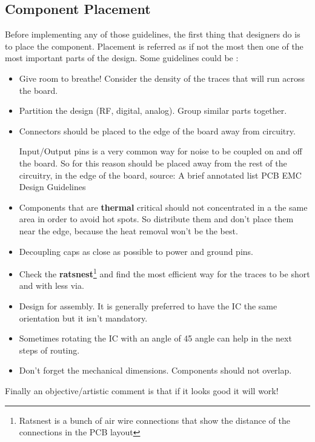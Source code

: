 \documentclass[final]{cubedoc}
\begin{document}
	\subsection{Component Placement}
	
	Before implementing any of those guidelines, the first thing that designers do is to place the component. Placement is referred as if not the most then one of the most important parts of the design. Some guidelines could be \cite{allcircuits:thermal, hubing2003pcb, ema2019hitchhiker, rangu2014getting}:
	
	\begin{itemize}
		\item Give room to breathe! Consider the density of the traces that will run across the board.
		\item Partition the design (RF, digital, analog). Group similar parts together.
		\item Connectors should be placed to the edge of the board away from circuitry.
		
		Input/Output pins is a very common way for noise to be coupled on and off the board. So for this reason should be placed away from the rest of the circuitry, in the edge of the board, source: A brief annotated list PCB EMC Design Guidelines
		
		\item Components that are \textbf{thermal} critical should not concentrated in a the same area in order to avoid hot spots. So distribute them and don't place them near the edge, because the heat removal won't be the best. 
		\item Decoupling caps as close as possible to power and ground pins.
		\item Check the \textbf{ratsnest}\footnote{Ratsnest is a bunch of air wire connections that show the distance of the connections in the PCB layout} and find the most efficient way for the traces to be short and with less via.
		\item Design for assembly. It is generally preferred to have the IC the same orientation but it isn't mandatory.
		\item Sometimes rotating the IC with an angle of 45 angle can help in the next steps of routing.
		\item Don't forget the mechanical dimensions. Components should not overlap.
	\end{itemize}
	
	Finally an objective/artistic comment is that if it looks good it will work!
	
\end{document}
